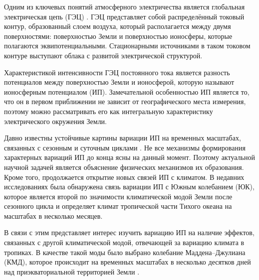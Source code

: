 Одним из ключевых понятий атмосферного электричества является глобальная электрическая цепь (ГЭЦ) \cite{Williams_Mareev_2014}. ГЭЦ представляет собой распределённый токовый контур, образованный слоем воздуха, который располагается между двумя поверхностями: поверхностью Земли и поверхностью ионосферы, которые полагаются эквипотенциальными. %
Стационарными источниками в таком токовом контуре выступают облака с развитой электрической структурой.%

Характеристикой интенсивности ГЭЦ постоянного тока является разность потенциалов между поверхностью Земли и ионосферой, которую называют ионосферным потенциалом (ИП).
Замечательной особенностью ИП является то, что он в первом приближении не зависит от географического места измерения, поэтому можно рассматривать его как интегральную характеристику электрического окружения Земли.


Давно известны устойчивые картины вариации ИП на временных масштабах, связанных с сезонным и суточным циклами \cite{Lavigne_et_al_2017}. Не все механизмы формирования характерных вариаций ИП до конца ясны на данный момент. Поэтому актуальной научной задачей является объяснение физических механизмов их образования. Кроме того, продолжается открытие новых связей ИП с климатом. В недавних исследованиях \cite{Slyunyaev_et_al_2021a,Slyunyaev_et_al_2021b,Slyunyaev_et_al_2021c} была обнаружена связь вариации ИП с Южным колебанием (ЮК), которое является второй по значимости климатической модой Земли после сезонного цикла и определяет климат тропической части Тихого океана на масштабах в несколько месяцев.

В связи с этим представляет интерес изучить вариацию ИП на наличие эффектов, связанных с другой климатической модой, отвечающей за вариацию климата в тропиках. В качестве такой моды было выбрано колебание Маддена–Джулиана (КМД), которое происходит на временных масштабах в несколько десятков дней над приэкваториальной территорией Земли \cite{Zhang_2005}.


